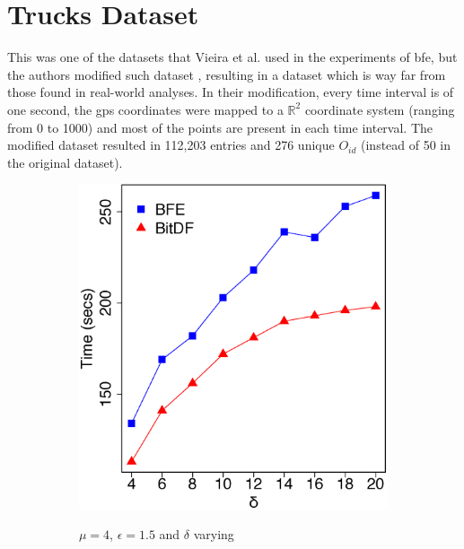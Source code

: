 {\section{Trucks Dataset}
\label{sec:trucks}
This was one of the datasets that Vieira et al. \citep{vieira} used in the experiments of \ac{bfe}, but the authors
modified such dataset \citep{trucksdataset}, resulting in a dataset which is way far from those found in real-world
analyses. In their modification, every time interval is of one second, the \ac{gps} coordinates were mapped to a
$\mathbb{R}^2$ coordinate system (ranging from 0 to 1000) and most of the points are present in each time interval. The
modified dataset resulted in 112,203 entries and 276 unique $O_{id}$ (instead of 50 in the original dataset).

\begin{figure}[h!]
    \centering
    \caption{Results varying $\delta$ and $\epsilon$ for Trucks dataset}
    \begin{subfigure}[t]{0.48\textwidth}
        \caption{$\mu = 4$, $\epsilon = 1.5$ and $\delta$ varying}
        \includegraphics[width=\textwidth]{images/Trucks_n_4_g_1_5_varying_l.eps}
        \label{fig:trucks_vary_l}
    \end{subfigure}
    \begin{subfigure}[t]{0.48\textwidth}

\end{subfigure}
\end{figure}}
